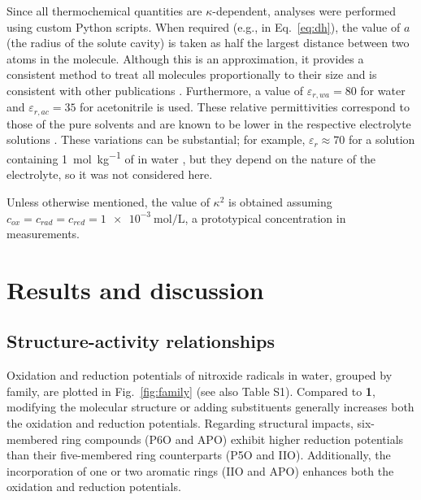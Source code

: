 \documentclass[review,preprint]{elsarticle}
\begin{document}
Since all thermochemical quantities are $\kappa$-dependent, analyses were performed using custom Python scripts. When required (e.g., in Eq.~\eqref{eq:dh}), the value of $a$ (the radius of the solute cavity) is taken as half the largest distance between two atoms in the molecule. Although this is an approximation, it provides a consistent method to treat all molecules proportionally to their size and is consistent with other publications \cite{matsuiDensityFunctionalTheory2013}.  Furthermore, a value of $\varepsilon_{r,wa}=80$ for water and $\varepsilon_{r,ac}=35$ for acetonitrile is used. These relative permittivities correspond to those of the pure solvents and are known to be lower in the respective electrolyte solutions \cite{silvaTrueHuckelEquation2022}. These variations can be substantial; for example, $\varepsilon_r \approx 70$ for a solution containing \SI{1}{\mol\per\kilo\gram} of  in water \cite{kontogeorgisDebyeHuckelTheoryIts2018, silvaTrueHuckelEquation2022}, but they depend on the nature of the electrolyte, so it was not considered here.


Unless otherwise mentioned, the value of $\kappa^2$ is obtained assuming  $c_{ox} = c_{rad} = c_ {red} = \SI{1e-3}{\mole\per\liter}$, a prototypical concentration in measurements.

\clearpage

\section{Results and discussion} \label{sec:results}

\subsection{Structure-activity relationships} \label{sec:sar}


Oxidation and reduction potentials of nitroxide radicals in water, grouped by family, are plotted in Fig.~\ref{fig:family} (see also Table S1). Compared to \textbf{1}, modifying the molecular structure or adding substituents generally increases both the oxidation and reduction potentials. Regarding structural impacts, six-membered ring compounds (P6O and APO) exhibit higher reduction potentials than their five-membered ring counterparts (P5O and IIO). Additionally, the incorporation of one or two aromatic rings (IIO and APO) enhances both the oxidation and reduction potentials.
\end{document}
